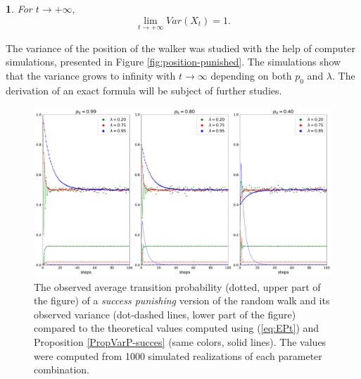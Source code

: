 \documentclass{amsart}
\theoremstyle{definition}
\theoremstyle{plain}
\theoremstyle{plain}
\newtheorem{cor}[thm]{\protect\corollaryname}
\theoremstyle{plain}
\numberwithin{equation}{section}
\providecommand{\corollaryname}{Corollary}
\begin{document}
    \begin{cor}
        For $t\rightarrow+\infty,$ \textup{
            \begin{equation}
                \lim_{t\to+\infty}Var(X_{t})=1.
            \end{equation}
        }
    \end{cor}

    The variance of the position of the walker was studied with the help of computer simulations, presented in Figure \ref{fig:position-punished}. The simulations show that the variance grows to infinity with $t\rightarrow\infty$ depending on both $p_0$ and $\lambda$. The derivation of an exact formula will be subject of further studies.

    \begin{figure}
        \begin{center}
            \includegraphics[width=1\textwidth]{../simulations/e_probability_1000_walks_100_steps_type_success_punished}
            \caption{\label{fig:The-development-punished}The observed
            average transition probability (dotted, upper part of the figure)
                of a \emph{success punishing} version of the random walk and its observed
                variance (dot-dashed lines, lower part of the figure) compared to
                the theoretical values computed using (\ref{eq:EPt}) and Proposition
                \ref{PropVarP-succes} (same colors, solid lines). The values were
                computed from 1000 simulated realizations of each parameter combination.}
        \end{center}
    \end{figure}
\end{document}
